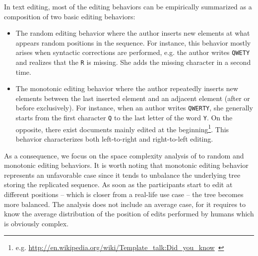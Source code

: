 In text editing, most of the editing behaviors can be empirically summarized as
a composition of two basic editing behaviors:
\begin{itemize}
\item The random editing behavior where the author inserts new elements at what
  appears random positions in the sequence. For instance, this behavior mostly
  arises when syntactic corrections are performed, e.g. the author writes
  \texttt{QWETY} and realizes that the \texttt{R} is missing. She adds the
  missing character in a second time.
\item The monotonic editing behavior where the author repeatedly inserts new
  elements between the last inserted element and an adjacent element (after or
  before exclusively). For instance, when an author writes \texttt{QWERTY}, she
  generally starts from the first character \texttt{Q} to the last letter of the
  word \texttt{Y}. On the opposite, there exist documents mainly edited at the
  beginning\footnote{e.g. \url{http://en.wikipedia.org/wiki/Template_talk:Did_you_know}~\cite{nedelec2013lseq}}. This
  behavior characterizes both left-to-right and right-to-left editing.
\end{itemize}

\noindent As a consequence, we focus on the space complexity analysis of \LSEQ
to random and monotonic editing behaviors. It is worth noting that monotonic
editing behavior represents an unfavorable case since it tends to unbalance the
underlying tree storing the replicated sequence. As soon as the participants
start to edit at different positions -- which is closer from a real-life use
case -- the tree becomes more balanced.
The analysis does not include an average case, for it requires to know
the average distribution of the position of edits performed by humans which is
obviously complex.

